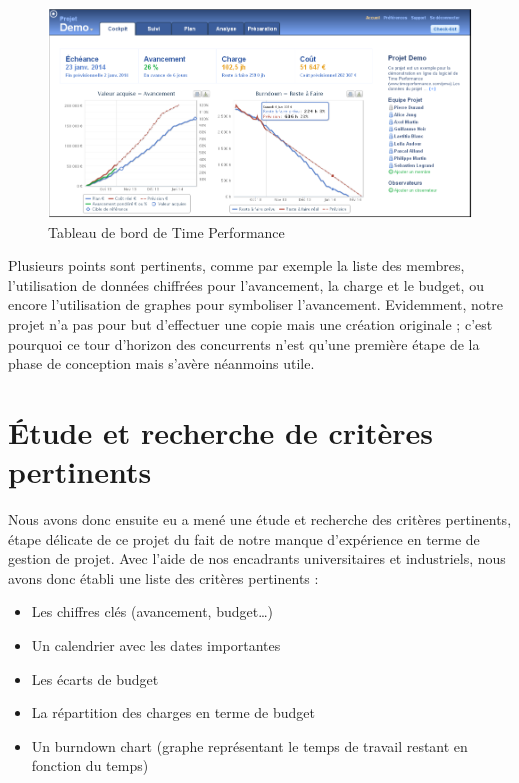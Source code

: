 \documentclass[12pt]{report}
\begin{document}
\begin{figure}[H]
	\centering
	\includegraphics[width=1\textwidth]{pictures/clement/c2.png}
	\caption{Tableau de bord de Time Performance}
	\label{c2}
\end{figure}

Plusieurs points sont pertinents, comme par exemple la liste des membres, l’utilisation de données chiffrées pour l’avancement, la charge et le budget, ou encore l’utilisation de graphes pour symboliser l’avancement. Evidemment, notre projet n’a pas pour but d’effectuer une copie mais une création originale ; c’est pourquoi ce tour d’horizon des concurrents n’est qu’une première étape de la phase de conception mais s’avère néanmoins utile.\\
	
	\section{Étude et recherche de critères pertinents}
	
Nous avons donc ensuite eu a mené une étude et recherche des critères pertinents, étape délicate de ce projet du fait de notre manque d’expérience en terme de gestion de projet. Avec l’aide de nos encadrants universitaires et industriels, nous avons donc établi une liste des critères pertinents :\\

\begin{itemize}
\item Les chiffres clés (avancement, budget…)
\item Un calendrier avec les dates importantes
\item Les écarts de budget
\item La répartition des charges en terme de budget
\item Un burndown chart (graphe représentant le temps de travail restant en fonction du temps)\\
\end{itemize}
\end{document}
